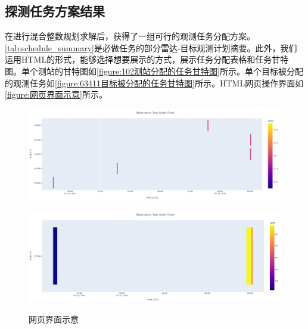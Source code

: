 \documentclass[openany,12pt,UTF8]{ctexart}
\begin{document}
\subsection{探测任务方案结果}
在进行混合整数规划求解后，获得了一组可行的观测任务分配方案。\autoref{tab:schedule_summary}是必做任务的部分雷达-目标观测计划摘要。此外，我们运用HTML的形式，能够选择想要展示的方式，展示任务分配表格和任务甘特图。单个测站的甘特图如\autoref{figure:102测站分配的任务甘特图}所示。单个目标被分配的观测任务如\autoref{figure:63411目标被分配的任务甘特图}所示。HTML网页操作界面如\autoref{figure:网页界面示意}所示。
\begin{figure}[htbp]\centering
	\begin{minipage}[b]{0.49\columnwidth}\centering
		\includegraphics[width=\linewidth]{figures/102测站.png}\label{figure:102测站分配的任务甘特图}
	\end{minipage}
	\begin{minipage}[b]{0.49\columnwidth}\centering
		\includegraphics[width=\linewidth]{figures/63411目标.png}\label{figure:63411目标被分配的任务甘特图}
	\end{minipage}
	\caption{网页界面示意}\label{figure:网页界面示意}
\end{figure}
\end{document}
